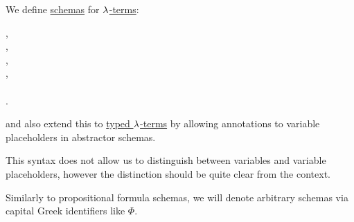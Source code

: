 \begin{definition}\label{def:lambda_term_schema}
  We define \hyperref[con:schemas_and_instances]{schemas} for \hyperref[def:lambda_term]{\( \synlambda \)-terms}:
  \begin{bnf*}
     {}, \\
         {}, \\
       {\bnftsq{\( ( \)} \bnfsp {} \bnfsp {} \bnfsp \bnftsq{\( ) \)}}, \\
       {\bnftsq{\( ( \)} \bnfsp \bnftsq{\( \synlambda \)} \bnfsp {} \bnfsp {} \bnfsp {} \bnfsp \bnftsq{\( ) \)}}, \\
              { \bnfor {} \bnfor {} \bnfor} \\
    .
  \end{bnf*}
  and also extend this to \hyperref[def:typed_lambda_term]{typed \( \synlambda \)-terms} by allowing annotations to variable placeholders in abstractor schemas.
\end{definition}
\begin{comments}
  \item This syntax does not allow us to distinguish between variables and variable placeholders, however the distinction should be quite clear from the context.

  \item Similarly to propositional formula schemas, we will denote arbitrary schemas via capital Greek identifiers like \( \Phi \).
\end{comments}

